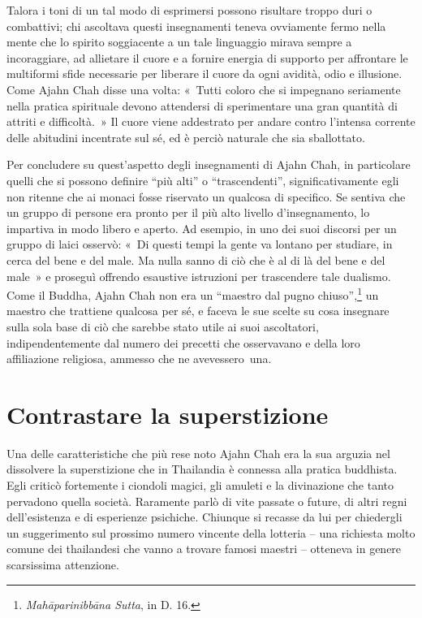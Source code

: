 Talora i toni di un tal modo di esprimersi possono risultare troppo duri
o combattivi; chi ascoltava questi insegnamenti teneva ovviamente fermo
nella mente che lo spirito soggiacente a un tale linguaggio mirava
sempre a incoraggiare, ad allietare il cuore e a fornire energia di
supporto per affrontare le multiformi sfide necessarie per liberare il
cuore da ogni avidità, odio e illusione. Come Ajahn Chah disse una
volta: «~Tutti coloro che si impegnano seriamente nella pratica
spirituale devono attendersi di sperimentare una gran quantità di
attriti e difficoltà.~» Il cuore viene addestrato per andare contro
l'intensa corrente delle abitudini incentrate sul sé, ed è perciò
naturale che sia sballottato.

Per concludere su quest'aspetto degli insegnamenti di Ajahn Chah, in
particolare quelli che si possono definire ``più alti'' o
``trascendenti'', significativamente egli non ritenne che ai monaci
fosse riservato un qualcosa di specifico. Se sentiva che un gruppo di
persone era pronto per il più alto livello d'insegnamento, lo impartiva
in modo libero e aperto. Ad esempio, in uno dei suoi discorsi per un
gruppo di laici osservò: «~Di questi tempi la gente va lontano per
studiare, in cerca del bene e del male. Ma nulla sanno di ciò che è al
di là del bene e del male~» e proseguì offrendo esaustive istruzioni per
trascendere tale dualismo. Come il Buddha, Ajahn Chah non era un
``maestro dal pugno chiuso'',\footnote{\emph{Mahāparinibbāna Sutta}, in D. 16.}
un maestro che trattiene qualcosa per sé, e
faceva le sue scelte su cosa insegnare sulla sola base di ciò che
sarebbe stato utile ai suoi ascoltatori, indipendentemente dal numero
dei precetti che osservavano e della loro affiliazione religiosa,
ammesso che ne avevessero~una.

\section{Contrastare la superstizione}

Una delle caratteristiche che più rese noto Ajahn Chah era la sua
arguzia nel dissolvere la superstizione che in Thailandia è connessa
alla pratica buddhista. Egli criticò fortemente i ciondoli magici, gli
amuleti e la divinazione che tanto pervadono quella società. Raramente
parlò di vite passate o future, di altri regni dell'esistenza e di
esperienze psichiche. Chiunque si recasse da lui per chiedergli un
suggerimento sul prossimo numero vincente della lotteria -- una
richiesta molto comune dei thailandesi che vanno a trovare famosi
maestri -- otteneva in genere scarsissima attenzione.

